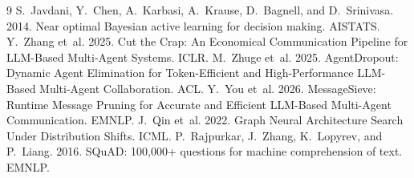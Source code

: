 \documentclass[11pt]{article}
\begin{document}
\begin{thebibliography}{9}
 S.~Javdani, Y.~Chen, A.~Karbasi, A.~Krause, D.~Bagnell, and D.~Srinivasa. 2014. Near optimal Bayesian active learning for decision making. AISTATS.
 Y.~Zhang et~al. 2025. Cut the Crap: An Economical Communication Pipeline for LLM-Based Multi-Agent Systems. ICLR.
 M.~Zhuge et~al. 2025. AgentDropout: Dynamic Agent Elimination for Token-Efficient and High-Performance LLM-Based Multi-Agent Collaboration. ACL.
 Y.~You et~al. 2026. MessageSieve: Runtime Message Pruning for Accurate and Efficient LLM-Based Multi-Agent Communication. EMNLP.
 J.~Qin et~al. 2022. Graph Neural Architecture Search Under Distribution Shifts. ICML.
 P.~Rajpurkar, J.~Zhang, K.~Lopyrev, and P.~Liang. 2016. SQuAD: 100,000+ questions for machine comprehension of text. EMNLP.
\end{thebibliography}
\end{document}
